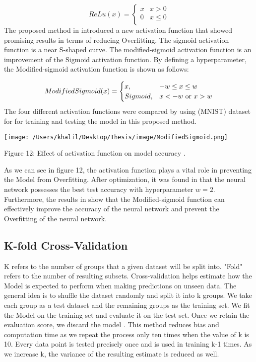 \documentclass[oneside,12pt,article]{article}
\begin{document}
 \[ReLu(x) = \begin{cases} 
   x & x > 0 \\
   0 & x\leq 0\\
  
  \end{cases}
\]
The proposed method in \cite{li2019research} introduced a new activation function that showed promising results in terms of reducing Overfitting. The sigmoid activation function is a near S-shaped curve. The modified-sigmoid activation function is an improvement of the Sigmoid activation function. By defining a hyperparameter, the Modified-sigmoid activation function is shown as follows:

 \[ModifiedSigmoid(x) = \begin{cases} 
   x  , & -w \leq x \leq w \\
   Sigmoid  , & x< -w $ or $ x>w\\
  
  \end{cases}
\]
The four different activation functions were compared by \cite{li2019research} using (MNIST) dataset for for training and testing the model in this proposed method. \newline
\begin{center}
\texttt{[image: /Users/khalil/Desktop/Thesis/image/ModifiedSigmoid.png]} 

Figure 12: Effect of activation function on model accuracy \cite{li2019research}.
\end{center}

As we can see in figure 12, the activation function plays a vital role in preventing the Model from Overfitting.
After optimization, it was found in \cite{li2019research} that the neural network possesses the best test accuracy with hyperparameter $w = 2$. Furthermore, the results in \cite{li2019research} show that the Modified-sigmoid function can effectively improve the accuracy of the neural network and prevent the Overfitting of the neural network.

 \subsection{K-fold Cross-Validation }
 
 K refers to the number of groups that a given dataset will be split into. "Fold" refers to the number of resulting subsets. Cross-validation helps estimate how the Model is expected to perform when making predictions on unseen data. The general idea is to shuffle the dataset randomly and split it into k groups. We take each group as a test dataset and the remaining groups as the training set. We fit the Model on the training set and evaluate it on the test set. Once we retain the evaluation score, we discard the model \cite{ng1997preventing}. This method reduces bias and computation time as we repeat the process only ten times when the value of k is 10. Every data point is tested precisely once and is used in training k-1 times. As we increase k, the variance of the resulting estimate is reduced as well. 
 
\end{document}
